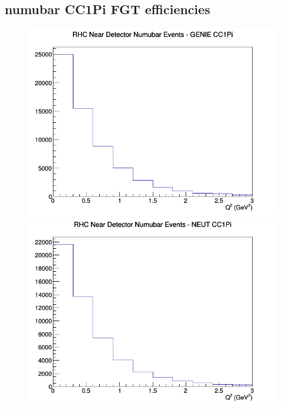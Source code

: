 \documentclass[12pt]{article}
\begin{document}
\subsection{numubar CC1Pi FGT efficiencies}
\begin{figure}[h]
\includegraphics[width=\linewidth]{eff_Q2/FGT/CC1Pi_RHC_ND_numubar_Q2_GENIE.png}
\endminipage
{}
\includegraphics[width=\linewidth]{eff_Q2/FGT/CC1Pi_RHC_ND_numubar_Q2_NEUT.png}
\endminipage
{}

\end{figure}
\end{document}
